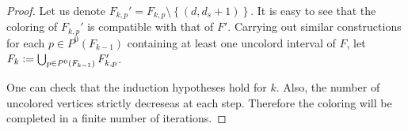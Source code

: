 \documentclass{article}
\theoremstyle{definition}
\newcommand{\defeq}{\vcentcolon=}
\begin{document}
\begin{proof}
        Let us denote $F_{k, p}' = 
        F_{k, p} \setminus \left\{
        \left(d, d_{s} + 1\right)\right\}$.
        It is easy to see that the coloring of
        $F_{k, p}'$ is compatible
        with that of
        $F'$.
        Carrying out similar constructions
        for each $p \in P^{0}\left(F_{k-1}\right)$
        containing at least one uncolord
        interval of $F$, let
        $F_{k} \defeq \bigcup_{p \in 
        P^{0}\left(F_{k-1}\right)} F_{k, p}'$.

        One can check that the 
        induction hypotheses hold
        for $k$.
        Also, the number of uncolored
        vertices strictly decreseas 
        at each step. Therefore
        the coloring will be 
        completed in a finite
        number of iterations.
    \end{proof}
\end{document}
